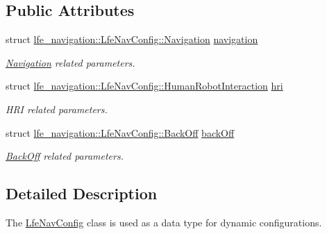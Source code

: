 \subsection*{Public Attributes}
\begin{DoxyCompactItemize}
\item 
struct \hyperlink{structlfe__navigation_1_1LfeNavConfig_1_1Navigation}{lfe\+\_\+navigation\+::\+Lfe\+Nav\+Config\+::\+Navigation} \hyperlink{classlfe__navigation_1_1LfeNavConfig_adaabd1b3bbbb979a70ba2d7e206982a5}{navigation}\hypertarget{classlfe__navigation_1_1LfeNavConfig_adaabd1b3bbbb979a70ba2d7e206982a5}{}\label{classlfe__navigation_1_1LfeNavConfig_adaabd1b3bbbb979a70ba2d7e206982a5}

\begin{DoxyCompactList}\small\item\em \hyperlink{structlfe__navigation_1_1LfeNavConfig_1_1Navigation}{Navigation} related parameters. \end{DoxyCompactList}\item 
struct \hyperlink{structlfe__navigation_1_1LfeNavConfig_1_1HumanRobotInteraction}{lfe\+\_\+navigation\+::\+Lfe\+Nav\+Config\+::\+Human\+Robot\+Interaction} \hyperlink{classlfe__navigation_1_1LfeNavConfig_ac58acb47be5599e0b05510d6b06d2e46}{hri}\hypertarget{classlfe__navigation_1_1LfeNavConfig_ac58acb47be5599e0b05510d6b06d2e46}{}\label{classlfe__navigation_1_1LfeNavConfig_ac58acb47be5599e0b05510d6b06d2e46}

\begin{DoxyCompactList}\small\item\em H\+RI related parameters. \end{DoxyCompactList}\item 
struct \hyperlink{structlfe__navigation_1_1LfeNavConfig_1_1BackOff}{lfe\+\_\+navigation\+::\+Lfe\+Nav\+Config\+::\+Back\+Off} \hyperlink{classlfe__navigation_1_1LfeNavConfig_ae11dfc006a6406617cbd9189568c0839}{back\+Off}\hypertarget{classlfe__navigation_1_1LfeNavConfig_ae11dfc006a6406617cbd9189568c0839}{}\label{classlfe__navigation_1_1LfeNavConfig_ae11dfc006a6406617cbd9189568c0839}

\begin{DoxyCompactList}\small\item\em \hyperlink{structlfe__navigation_1_1LfeNavConfig_1_1BackOff}{Back\+Off} related parameters. \end{DoxyCompactList}\end{DoxyCompactItemize}


\subsection{Detailed Description}
The \hyperlink{classlfe__navigation_1_1LfeNavConfig}{Lfe\+Nav\+Config} class is used as a data type for dynamic configurations. 

